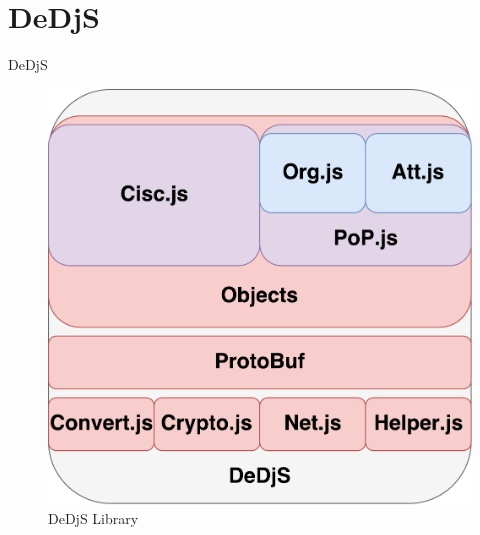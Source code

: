 \documentclass{beamer}
\begin{document}
\section{DeDjS}
\begin{frame}{DeDjS}

\begin{figure}[h]
\includegraphics[scale=.4]{graphic/dedjs.pdf}
\centering
\caption*{DeDjS Library}
\end{figure}

\end{frame}
\end{document}
